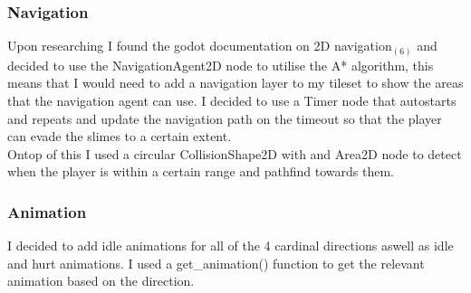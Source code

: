 \documentclass{article}
\begin{document}
        \subsubsection{Navigation}
        Upon researching I found the godot documentation on 2D navigation$_{(6)}$ and decided to use the NavigationAgent2D node to utilise the A* algorithm, this means that I would need to add a navigation layer to my tileset to show the areas that the navigation agent can use. I decided to use a Timer node that autostarts and repeats and update the navigation path on the timeout so that the player can evade the slimes to a certain extent.\\
        Ontop of this I used a circular CollisionShape2D with and Area2D node to detect when the player is within a certain range and pathfind towards them.\\
        \subsubsection{Animation}
        I decided to add idle animations for all of the 4 cardinal directions aswell as idle and hurt animations. I used a get\_animation() function to get the relevant animation based on the direction.
\end{document}
